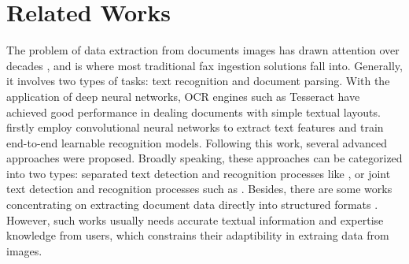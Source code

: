 \documentclass[sigconf]{acmart}
\begin{document}

\section{Related Works}
The problem of data extraction from documents images has drawn attention over decades \cite{nagy2000twenty}, and is where most traditional fax ingestion solutions fall into. Generally, it involves two types of tasks: text recognition and document parsing. With the application of deep neural networks, OCR engines such as Tesseract \cite{smith2007overview} have achieved good performance in dealing documents with simple textual layouts. \cite{jaderberg2014synthetic} firstly employ convolutional neural networks to extract text features and train end-to-end learnable recognition models. Following this work, several advanced approaches were proposed. Broadly speaking, these approaches can be categorized into two types: separated text detection and recognition processes like \cite{shi2017end, tian2016detecting, he2017deep, lyu2018multi, borisyuk2018rosetta}, or joint text detection and recognition processes such as \cite{li2017towards, buvsta2017deep, liu2018fots}. Besides, there are some works concentrating on extracting document data directly into structured formats \cite{cesarini1998informys, chanod2005legacy, peanho2012semantic, li2016precomputed}. However, such works usually needs accurate textual information and expertise knowledge from users, which constrains their adaptibility in extraing data from images.

\end{document}
